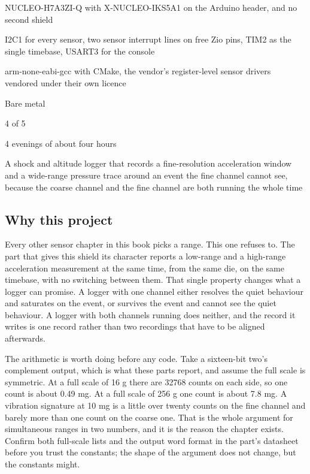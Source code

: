 
\begin{keyfacts}
\item[Board] NUCLEO-H7A3ZI-Q with X-NUCLEO-IKS5A1 on the Arduino header, and no second shield
\item[Peripherals] I2C1 for every sensor, two sensor interrupt lines on free Zio pins, TIM2 as the single timebase, USART3 for the console
\item[Toolchain] arm-none-eabi-gcc with CMake, the vendor's register-level sensor drivers vendored under their own licence
\item[Operating system] Bare metal
\item[Difficulty] 4 of 5
\item[Effort] 4 evenings of about four hours
\item[Deliverable] A shock and altitude logger that records a fine-resolution acceleration window and a wide-range pressure trace around an event the fine channel cannot see, because the coarse channel and the fine channel are both running the whole time
\end{keyfacts}

\subsection*{Why this project}

Every other sensor chapter in this book picks a range. This one refuses to. The
part that gives this shield its character reports a low-range and a high-range
acceleration measurement at the same time, from the same die, on the same
timebase, with no switching between them. That single property changes what a
logger can promise. A logger with one channel either resolves the quiet
behaviour and saturates on the event, or survives the event and cannot see the
quiet behaviour. A logger with both channels running does neither, and the
record it writes is one record rather than two recordings that have to be
aligned afterwards.

The arithmetic is worth doing before any code. Take a sixteen-bit two's
complement output, which is what these parts report, and assume the full scale
is symmetric. At a full scale of 16 g there are 32768 counts on each side, so
one count is about 0.49 mg. At a full scale of 256 g one count is about 7.8 mg.
A vibration signature at 10 mg is a little over twenty counts on the fine
channel and barely more than one count on the coarse one. That is the whole
argument for simultaneous ranges in two numbers, and it is the reason the
chapter exists. Confirm both full-scale lists and the output word format in the
part's datasheet before you trust the constants; the shape of the argument does
not change, but the constants might.


